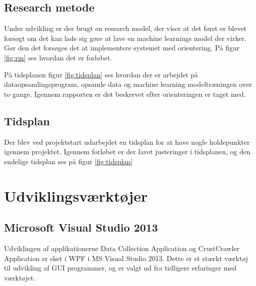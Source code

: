 \subsection{Research metode}
Under udvikling er der brugt en research model, der viser at det først er blevet forsøgt om det kan lade sig gøre at lave en machine learnings model der virker. Gør den det forsøges det at implementere systemet med orientering. På figur \ref{fig:rm} ses hvordan det er forløbet.


På tidsplanen figur \ref{fig:tidsplan} ses hvordan der er arbejdet på dataopsamlingsprogram, opsamle data og machine learning modeltræningen over to gange. Igennem rapporten er det beskrevet efter orienteringen er taget med.


\subsection{Tidsplan}
\label{sec:tidsplan}
Der blev ved projektstart udarbejdet en tidsplan for at have nogle holdepunkter igennem projektet. Igennem forløbet er der lavet justeringer i tidsplanen, og den endelige tidsplan ses på figur \ref{fig:tidsplan}


\section{Udviklingsværktøjer}
\label{sec:Udviklingsvaerktojer}

\subsection*{Microsoft Visual Studio 2013}
Udviklingen af applikationerne Data Collection Application og CrustCrawler Application er sket i WPF i MS Visual Studio 2013. Dette er et stærkt værktøj til udvikling af GUI programmer, og er valgt ud fra tidligere erfaringer med værktøjet.

